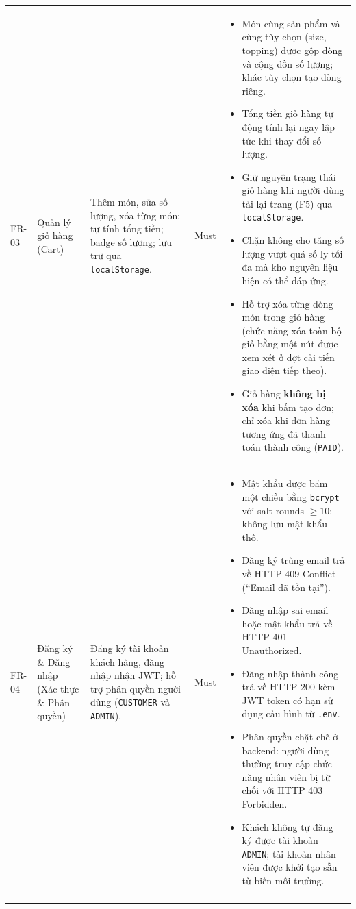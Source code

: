 \begin{longtable}{@{}p{1.2cm}p{2.6cm}p{4.2cm}p{1.4cm}p{6.6cm}@{}}
FR-03 & Quản lý giỏ hàng (Cart)
  & Thêm món, sửa số lượng, xóa từng món; tự tính tổng tiền; badge số lượng; lưu trữ qua \texttt{localStorage}.
  & Must
  & \begin{itemize}[leftmargin=*]
      \item Món cùng sản phẩm và cùng tùy chọn (size, topping) được gộp dòng và cộng dồn số lượng; khác tùy chọn tạo dòng riêng.
      \item Tổng tiền giỏ hàng tự động tính lại ngay lập tức khi thay đổi số lượng.
      \item Giữ nguyên trạng thái giỏ hàng khi người dùng tải lại trang (F5) qua \texttt{localStorage}.
      \item Chặn không cho tăng số lượng vượt quá số ly tối đa mà kho nguyên liệu hiện có thể đáp ứng.
      \item Hỗ trợ xóa từng dòng món trong giỏ hàng (chức năng xóa toàn bộ giỏ bằng một nút được xem xét ở đợt cải tiến giao diện tiếp theo).
      \item Giỏ hàng \textbf{không bị xóa} khi bấm tạo đơn; chỉ xóa khi đơn hàng tương ứng đã thanh toán thành công (\texttt{PAID}).
    \end{itemize} \\
\addlinespace

FR-04 & Đăng ký \& Đăng nhập (Xác thực \& Phân quyền)
  & Đăng ký tài khoản khách hàng, đăng nhập nhận JWT; hỗ trợ phân quyền người dùng (\texttt{CUSTOMER} và \texttt{ADMIN}).
  & Must
  & \begin{itemize}[leftmargin=*]
      \item Mật khẩu được băm một chiều bằng \texttt{bcrypt} với salt rounds $\ge 10$; không lưu mật khẩu thô.
      \item Đăng ký trùng email trả về HTTP 409 Conflict (``Email đã tồn tại'').
      \item Đăng nhập sai email hoặc mật khẩu trả về HTTP 401 Unauthorized.
      \item Đăng nhập thành công trả về HTTP 200 kèm JWT token có hạn sử dụng cấu hình từ \texttt{.env}.
      \item Phân quyền chặt chẽ ở backend: người dùng thường truy cập chức năng nhân viên bị từ chối với HTTP 403 Forbidden.
      \item Khách không tự đăng ký được tài khoản \texttt{ADMIN}; tài khoản nhân viên được khởi tạo sẵn từ biến môi trường.
    \end{itemize} \\
\addlinespace


\end{longtable}
